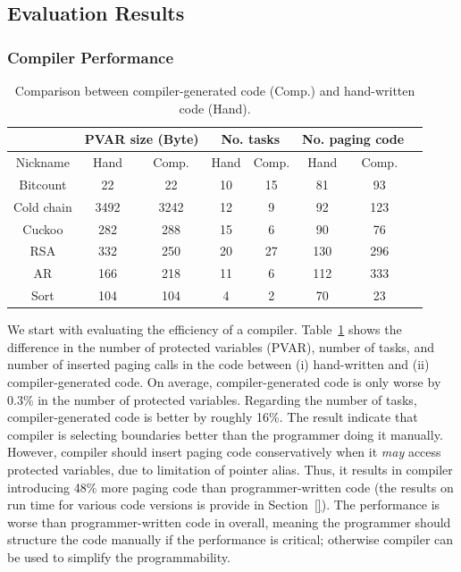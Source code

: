 \subsection{Evaluation Results}
\label{sec:results_evaluation}

\subsubsection{Compiler Performance}
\label{sec:results_compiler}

\begin{table}[t]
	\centering
	\footnotesize
	\begin{tabular}{|c|c|c|c|c|c|c|c|}
		\hline
		{} & \multicolumn{2}{l|}{{PVAR size (Byte)}} & \multicolumn{2}{c|}{{No. tasks}} & \multicolumn{2}{c|}{{No. paging code}} \\
		\hline
		Nickname & Hand & Comp. & Hand & Comp. & Hand & Comp. \\
		\hline\hline
		Bitcount & 22 & 22 & 10 & 15 & 81 & 93 \\
		Cold chain & 3492 & 3242 & 12 & 9 & 92 & 123 \\
		Cuckoo & 282 & 288 & 15 & 6 & 90 & 76 \\
		RSA & 332 & 250 & 20 & 27 & 130 & 296 \\
		AR & 166 & 218 & 11 & 6 & 112 & 333 \\
		Sort & 104 & 104 & 4 & 2 & 70 & 23 \\
		\hline
	\end{tabular}
	\caption{Comparison between compiler-generated \sys code (Comp.) and hand-written \sys code (Hand).}
\label{table:compiler_result}
\end{table}

We start with evaluating the efficiency of a \sys compiler. Table~\ref{table:compiler_result} shows the difference in the number of protected variables (PVAR), number of tasks, and number of inserted paging calls in the code between (i) hand-written \sys and (ii) compiler-generated \sys code. On average, compiler-generated code is only worse by 0.3\% in the number of protected variables. Regarding the number of tasks, compiler-generated code is better by roughly 16\%. The result indicate that \sys compiler is selecting boundaries better than the programmer doing it manually. However, \sys compiler should insert paging code conservatively when it {\em may} access protected variables, due to limitation of pointer alias. Thus, it results in \sys compiler introducing 48\% more paging code than programmer-written code (the results on run time for various \sys code versions is provide in Section~\ref{}). The performance is worse than programmer-written \sys code in overall, meaning the programmer should structure the code manually if the performance is critical; otherwise compiler can be used to simplify the programmability. 

